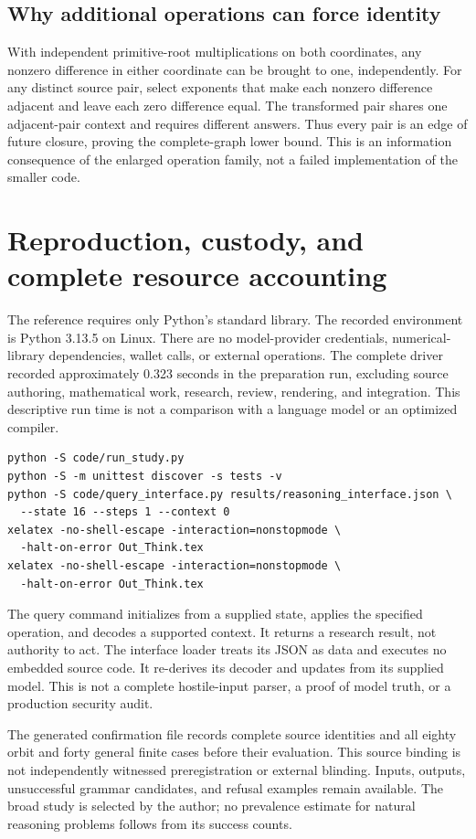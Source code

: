 \documentclass[11pt,letterpaper]{article}
\theoremstyle{remark}\newtheorem{remark}{Remark}[section]
\begin{document}
\subsection{Why additional operations can force identity}
With independent primitive-root multiplications on both coordinates, any nonzero difference in either coordinate can be brought to one, independently. For any distinct source pair, select exponents that make each nonzero difference adjacent and leave each zero difference equal. The transformed pair shares one adjacent-pair context and requires different answers. Thus every pair is an edge of future closure, proving the complete-graph lower bound. This is an information consequence of the enlarged operation family, not a failed implementation of the smaller code.

\section{Reproduction, custody, and complete resource accounting}
\label{app:reproduce}
The reference requires only Python's standard library. The recorded environment is Python 3.13.5 on Linux. There are no model-provider credentials, numerical-library dependencies, wallet calls, or external operations. The complete driver recorded approximately 0.323 seconds in the preparation run, excluding source authoring, mathematical work, research, review, rendering, and integration. This descriptive run time is not a comparison with a language model or an optimized compiler.

\begin{lstlisting}
python -S code/run_study.py
python -S -m unittest discover -s tests -v
python -S code/query_interface.py results/reasoning_interface.json \
  --state 16 --steps 1 --context 0
xelatex -no-shell-escape -interaction=nonstopmode \
  -halt-on-error Out_Think.tex
xelatex -no-shell-escape -interaction=nonstopmode \
  -halt-on-error Out_Think.tex
\end{lstlisting}

The query command initializes from a supplied state, applies the specified operation, and decodes a supported context. It returns a research result, not authority to act. The interface loader treats its JSON as data and executes no embedded source code. It re-derives its decoder and updates from its supplied model. This is not a complete hostile-input parser, a proof of model truth, or a production security audit.

The generated confirmation file records complete source identities and all eighty orbit and forty general finite cases before their evaluation. This source binding is not independently witnessed preregistration or external blinding. Inputs, outputs, unsuccessful grammar candidates, and refusal examples remain available. The broad study is selected by the author; no prevalence estimate for natural reasoning problems follows from its success counts.
\end{document}
